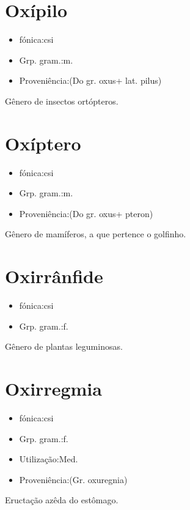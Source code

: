 \section{Oxípilo}
\begin{itemize}
\item {fónica:csi}
\end{itemize}
\begin{itemize}
\item {Grp. gram.:m.}
\end{itemize}
\begin{itemize}
\item {Proveniência:(Do gr. \textunderscore oxus\textunderscore  + lat. \textunderscore pilus\textunderscore )}
\end{itemize}
Gênero de insectos ortópteros.
\section{Oxíptero}
\begin{itemize}
\item {fónica:csi}
\end{itemize}
\begin{itemize}
\item {Grp. gram.:m.}
\end{itemize}
\begin{itemize}
\item {Proveniência:(Do gr. \textunderscore oxus\textunderscore  + \textunderscore pteron\textunderscore )}
\end{itemize}
Gênero de mamíferos, a que pertence o golfinho.
\section{Oxirrânfide}
\begin{itemize}
\item {fónica:csi}
\end{itemize}
\begin{itemize}
\item {Grp. gram.:f.}
\end{itemize}
Gênero de plantas leguminosas.
\section{Oxirregmia}
\begin{itemize}
\item {fónica:csi}
\end{itemize}
\begin{itemize}
\item {Grp. gram.:f.}
\end{itemize}
\begin{itemize}
\item {Utilização:Med.}
\end{itemize}
\begin{itemize}
\item {Proveniência:(Gr. \textunderscore oxuregnia\textunderscore )}
\end{itemize}
Eructação azêda do estômago.
